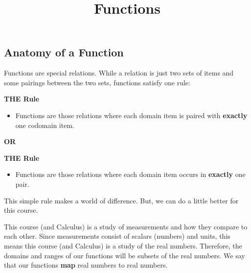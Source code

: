 \documentclass{ximera}
\title{Functions}
\begin{document}
\begin{abstract}
\end{abstract}
\maketitle





\subsection*{Anatomy of a Function}


Functions are special relations. While a relation is just two sets of items and some pairings between the two sets, functions satisfy one rule: 


\begin{condition} \textbf{\textcolor{green!50!black}{THE Rule}}  

\begin{itemize}
\item Functions are those relations where each domain item is paired with \textbf{exactly} one codomain item.
\end{itemize}
\end{condition}


\begin{center}
\textbf{OR}
\end{center}


\begin{condition} \textbf{\textcolor{green!50!black}{THE Rule}} 

\begin{itemize}
\item Functions are those relations where each domain item occurs in \textbf{exactly} one pair.
\end{itemize}
\end{condition}




This simple rule makes a world of difference. But, we can do a little better for this course. 




This course (and Calculus) is a study of measurements and how they compare to each other. Since measurements consist of scalars (numbers) and units, this means this course (and Calculus) is a study of the real numbers.  Therefore, the domains and ranges of our functions will be subsets of the real numbers.  We say that our functions \textbf{map} real numbers to real numbers.
\end{document}
